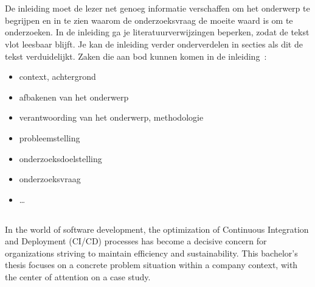 
\chapter{}%
\label{ch:inleiding}

De inleiding moet de lezer net genoeg informatie verschaffen om het onderwerp te begrijpen en in te zien waarom de onderzoeksvraag de moeite waard is om te onderzoeken. In de inleiding ga je literatuurverwijzingen beperken, zodat de tekst vlot leesbaar blijft. Je kan de inleiding verder onderverdelen in secties als dit de tekst verduidelijkt. Zaken die aan bod kunnen komen in de inleiding~\autocite{Pollefliet2011}:

\begin{itemize}
  \item context, achtergrond
  \item afbakenen van het onderwerp
  \item verantwoording van het onderwerp, methodologie
  \item probleemstelling
  \item onderzoeksdoelstelling
  \item onderzoeksvraag
  \item \ldots
\end{itemize}

\section{}%
\label{sec:probleemstelling}

In the world of software development, the optimization of Continuous Integration and Deployment (CI/CD) processes has become a decisive concern for organizations striving to maintain efficiency and sustainability.
This bachelor's thesis focuses on a concrete problem situation within a company context, with the center of attention on a case study.

